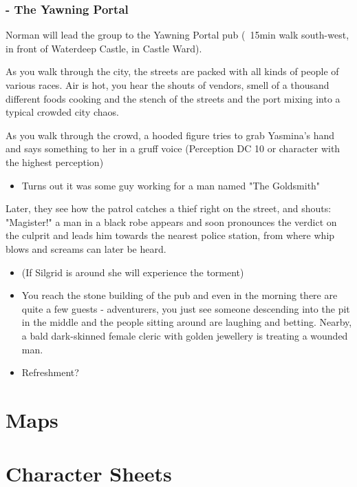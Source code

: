 \documentclass[10pt,onecolumn,twoside,openany,bg=full,layout=true]{dndbook}
\begin{document}
\subsection{ - The Yawning Portal}\label{subsec:\arabic{subact_num}-the-yawning-portal}
\addtocounter{subact_num}{1}
Norman will lead the group to the Yawning Portal pub (~15min walk south-west, in front of Waterdeep Castle, in Castle Ward).
\begin{DndReadAloud}
As you walk through the city, the streets are packed with all kinds of people of various races.
Air is hot, you hear the shouts of vendors, smell of a thousand different foods cooking and the stench of the streets and the port mixing into a typical crowded city chaos.
\end{DndReadAloud}

As you walk through the crowd, a hooded figure tries to grab Yasmina’s hand and says something to her in a gruff voice
(Perception DC 10 or character with  the highest perception)


\begin{itemize}
\item Turns out it was some guy working for a man named "The Goldsmith"


\end{itemize}
Later, they see how the patrol catches a thief right on the street, and shouts: "Magister!" a man in a black robe appears and soon pronounces the verdict on the culprit and leads him towards the nearest police station, from where whip blows and screams can later be heard.


\begin{itemize}
\item (If Silgrid is around she will experience the torment)


\end{itemize}
\begin{itemize}
\item You reach the stone building of the pub and even in the morning there are quite a few guests - adventurers, you just see someone descending into the pit in the middle and the people sitting around are laughing and betting. Nearby, a bald dark-skinned female cleric with golden jewellery is treating a wounded man.


\item Refreshment?


\end{itemize}







\vfill
\newpage

\chapter{Maps}\label{ch:maps}

\chapter{Character Sheets}\label{ch:charactersheets}
\end{document}
